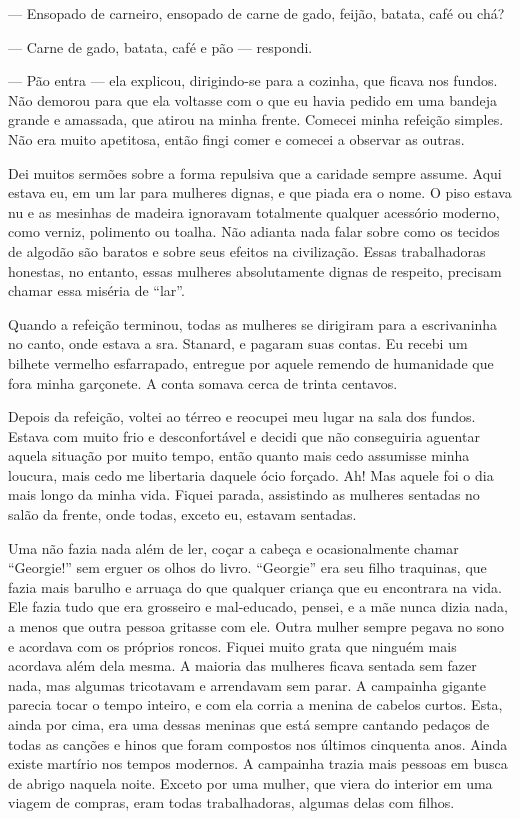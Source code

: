 --- Ensopado de carneiro, ensopado de carne de gado, feijão, batata,
café ou chá?

--- Carne de gado, batata, café e pão --- respondi.

--- Pão entra --- ela explicou, dirigindo-se para a cozinha, que ficava
nos fundos. Não demorou para que ela voltasse com o que eu havia
pedido em uma bandeja grande e amassada, que atirou na minha frente.
Comecei minha refeição simples. Não era muito apetitosa, então fingi
comer e comecei a observar as outras.

Dei muitos sermões sobre a forma repulsiva que a caridade sempre assume.
Aqui estava eu, em um lar para mulheres dignas, e que piada era o nome.
O piso estava nu e as mesinhas de madeira ignoravam totalmente qualquer
acessório moderno, como verniz, polimento ou toalha. Não adianta nada
falar sobre como os tecidos de algodão são baratos e sobre seus efeitos
na civilização. Essas trabalhadoras honestas, no entanto, essas mulheres
absolutamente dignas de respeito, precisam chamar essa miséria de
``lar''.

Quando a refeição terminou, todas as mulheres se dirigiram para a
escrivaninha no canto, onde estava a sra. Stanard, e pagaram suas
contas. Eu recebi um bilhete vermelho esfarrapado, entregue por aquele
remendo de humanidade que fora minha garçonete. A conta somava cerca de
trinta centavos.

Depois da refeição, voltei ao térreo e reocupei meu lugar na sala dos
fundos. Estava com muito frio e desconfortável e decidi que não
conseguiria aguentar aquela situação por muito tempo, então quanto mais
cedo assumisse minha loucura, mais cedo me libertaria daquele ócio
forçado. Ah! Mas aquele foi o dia mais longo da minha vida. Fiquei
parada, assistindo as mulheres sentadas no salão da frente, onde todas,
exceto eu, estavam sentadas.

Uma não fazia nada além de ler, coçar a cabeça e ocasionalmente chamar
``Georgie!'' sem erguer os olhos do livro. ``Georgie'' era seu filho
traquinas, que fazia mais barulho e arruaça do que qualquer criança que
eu encontrara na vida. Ele fazia tudo que era grosseiro e mal-educado,
pensei, e a mãe nunca dizia nada, a menos que outra pessoa gritasse com
ele. Outra mulher sempre pegava no sono e acordava com os próprios
roncos. Fiquei muito grata que ninguém mais acordava além dela mesma. A
maioria das mulheres ficava sentada sem fazer nada, mas algumas
tricotavam e arrendavam sem parar. A campainha gigante parecia tocar o
tempo inteiro, e com ela corria a menina de cabelos curtos. Esta, ainda
por cima, era uma dessas meninas que está sempre cantando pedaços de
todas as canções e hinos que foram compostos nos últimos cinquenta anos.
Ainda existe martírio nos tempos modernos. A campainha trazia mais
pessoas em busca de abrigo naquela noite. Exceto por uma mulher, que
viera do interior em uma viagem de compras, eram todas trabalhadoras,
algumas delas com filhos.


